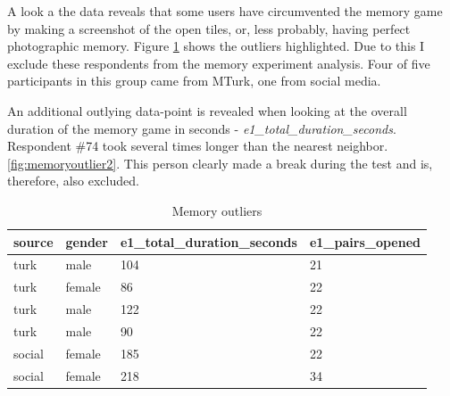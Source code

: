 		A look a the data reveals that some users have circumvented the memory game by making a screenshot of the open tiles, or, less probably, having perfect photographic memory. Figure \ref{tbl:e1-pairs-opened} shows the outliers highlighted. Due to this I exclude these respondents from the memory experiment analysis. Four of five participants in this group came from MTurk, one from social media.
		
		An additional outlying data-point is revealed when looking at the overall duration of the memory game in seconds - \textit{e1\_total\_duration\_seconds}. Respondent \#74 took several times longer than the nearest neighbor. \ref{fig:memoryoutlier2}. This person clearly made a break during the test and is, therefore, also excluded.
		
	
		\begin{table}[]
		\begin{center}
			\begin{tabular}{|l|l|l|l|}
				\hline 
				source & gender & e1\_total\_duration\_seconds & e1\_pairs\_opened \rule[-2ex]{0pt}{6ex} \\ \hline \hline
				turk   & male   & 104                          & \cellcolor[HTML]{FFFFC7}21                \\ \hline
				turk   & female & 86                           & \cellcolor[HTML]{FFFFC7}22                \\ \hline
				turk   & male   & 122                          & \cellcolor[HTML]{FFFFC7}22                \\ \hline
				turk   & male   & 90                           & \cellcolor[HTML]{FFFFC7}22                \\ \hline
				social & female & 185                          & \cellcolor[HTML]{FFFFC7}22                \\ \hline
				social & female & 218                          & 34                \\ \hline
			\end{tabular}
		\end{center}
		\caption{Memory outliers}
		\label{tbl:e1-pairs-opened}
		\end{table}
		
